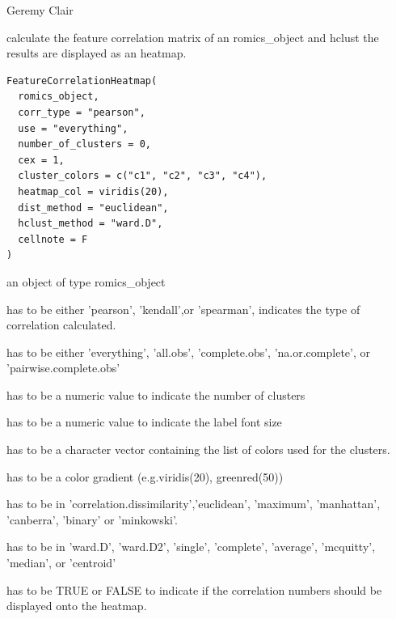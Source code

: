 \documentclass[a4paper]{book}
\begin{document}
%
\begin{Author}
Geremy Clair
\end{Author}
%
\begin{Description}
calculate the feature correlation matrix of an romics\_object and hclust the results are displayed as an heatmap.
\end{Description}
%
\begin{Usage}
\begin{verbatim}
FeatureCorrelationHeatmap(
  romics_object,
  corr_type = "pearson",
  use = "everything",
  number_of_clusters = 0,
  cex = 1,
  cluster_colors = c("c1", "c2", "c3", "c4"),
  heatmap_col = viridis(20),
  dist_method = "euclidean",
  hclust_method = "ward.D",
  cellnote = F
)
\end{verbatim}
\end{Usage}
%
\begin{Arguments}
\begin{ldescription}
\item[\code{romics\_object}] an object of type romics\_object

\item[\code{corr\_type}] has to be either 'pearson', 'kendall',or 'spearman', indicates the type of correlation calculated.

\item[\code{use}] has to be either 'everything', 'all.obs', 'complete.obs', 'na.or.complete', or 'pairwise.complete.obs'

\item[\code{number\_of\_clusters}] has to be a numeric value to indicate the number of clusters

\item[\code{cex}] has to be a numeric value to indicate the label font size

\item[\code{cluster\_colors}] has to be a character vector containing the list of colors used for the clusters.

\item[\code{heatmap\_col}] has to be a color gradient (e.g.viridis(20), greenred(50))

\item[\code{dist\_method}] has to be in 'correlation.dissimilarity','euclidean', 'maximum', 'manhattan', 'canberra', 'binary' or 'minkowski'.

\item[\code{hclust\_method}] has to be in 'ward.D', 'ward.D2', 'single', 'complete', 'average', 'mcquitty', 'median', or 'centroid'

\item[\code{cellnote}] has to be TRUE or FALSE to indicate if the correlation numbers should be displayed onto the heatmap.
\end{ldescription}
\end{Arguments}
\end{document}

